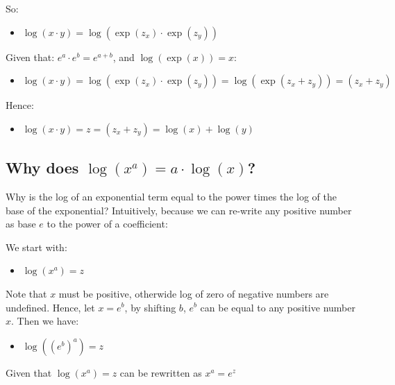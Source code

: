 \documentclass[
]{book}
\providecommand{\tightlist}{%
  \setlength{\itemsep}{0pt}\setlength{\parskip}{0pt}}
\begin{document}
So:

\begin{itemize}
\tightlist
\item
  \(\displaystyle \log (x\cdot y)=\log (\exp (z_x )\cdot \exp (z_y ))\)
\end{itemize}

Given that: \(e^a \cdot e^b =e^{a+b}\), and \(\log (\exp (x))=x\):

\begin{itemize}
\tightlist
\item
  \(\displaystyle \log (x\cdot y)=\log (\exp (z_x )\cdot \exp (z_y ))=\log (\exp (z_x +z_y ))=(z_x +z_y )\)
\end{itemize}

Hence:

\begin{itemize}
\tightlist
\item
  \(\displaystyle \log (x\cdot y)=z=(z_x +z_y )=\log (x)+\log (y)\)
\end{itemize}

\hypertarget{why-does-log-xa-acdot-log-x}{%
\subsection{\texorpdfstring{Why does \(\log (x^a )=a\cdot \log (x)\)?}{Why does \textbackslash log (x\^{}a )=a\textbackslash cdot \textbackslash log (x)?}}\label{why-does-log-xa-acdot-log-x}}

Why is the log of an exponential term equal to the power times the log
of the base of the exponential? Intuitively, because we can re-write any
positive number as base \(e\) to the power of a coefficient:

We start with:

\begin{itemize}
\tightlist
\item
  \(\displaystyle \log (x^a )=z\)
\end{itemize}

Note that \(x\) must be positive, otherwide log of zero of negative
numbers are undefined. Hence, let \(x=e^b\), by shifting \(b\), \(e^b\) can be
equal to any positive number \(x\). Then we have:

\begin{itemize}
\tightlist
\item
  \(\displaystyle \log \left({\left(e^b \right)}^a \right)=z\)
\end{itemize}

Given that \(\log (x^a )=z\) can be rewritten as \(x^a =e^z\)
\end{document}
